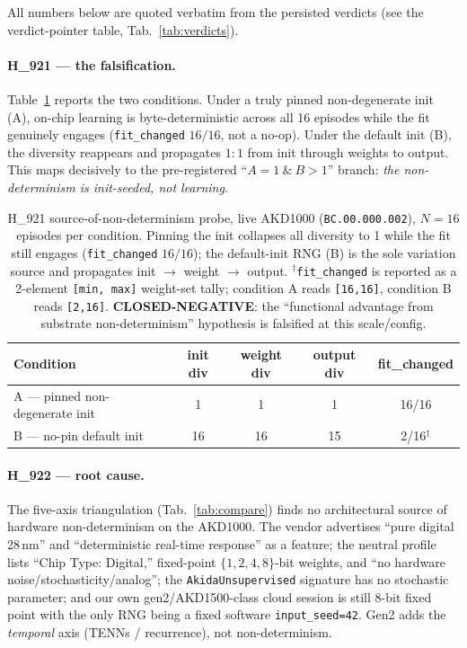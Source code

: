 \documentclass[11pt,a4paper]{article}
\providecommand{\tierRed}{🔴}
\renewcommand{\tierRed}{{\color{red!75!black}\textbullet}}
\begin{document}
All numbers below are quoted verbatim from the persisted verdicts (see the
verdict-pointer table, Tab.~\ref{tab:verdicts}).

\paragraph{H\_921 --- the falsification.} Table~\ref{tab:h921} reports the
two conditions. Under a truly pinned non-degenerate init (A), on-chip
learning is byte-deterministic across all 16 episodes while the fit
genuinely engages (\texttt{fit\_changed} \(16/16\), not a no-op). Under the
default init (B), the diversity reappears and propagates \(1{:}1\) from
init through weights to output. This maps decisively to the pre-registered
``\(A=1\ \&\ B>1\)'' branch: \emph{the non-determinism is init-seeded, not
learning}.

\begin{table}[h]
\centering
\small
\begin{tabular}{@{}lcccc@{}}
\toprule
\textbf{Condition} & \textbf{init div} & \textbf{weight div} & \textbf{output div} & \textbf{fit\_changed} \\
\midrule
A --- pinned non-degenerate init & 1  & 1  & 1  & 16/16 \\
B --- no-pin default init        & 16 & 16 & 15 & 2/16$^{\dagger}$ \\
\bottomrule
\end{tabular}
\caption{H\_921 source-of-non-determinism probe, live AKD1000
(\texttt{BC.00.000.002}), \(N=16\) episodes per condition. Pinning the init
collapses all diversity to 1 while the fit still engages
(\texttt{fit\_changed} \(16/16\)); the default-init RNG (B) is the sole
variation source and propagates init \(\rightarrow\) weight \(\rightarrow\)
output. $^{\dagger}$\texttt{fit\_changed} is reported as a 2-element
\texttt{[min, max]} weight-set tally; condition A reads \texttt{[16,16]},
condition B reads \texttt{[2,16]}. \tierRed{} \textbf{CLOSED-NEGATIVE}: the
``functional advantage from substrate non-determinism'' hypothesis is
falsified at this scale/config.}
\label{tab:h921}
\end{table}

\paragraph{H\_922 --- root cause.} The five-axis triangulation
(Tab.~\ref{tab:compare}) finds no architectural source of hardware
non-determinism on the AKD1000. The vendor advertises ``pure digital 28\,nm''
and ``deterministic real-time response'' as a feature; the neutral profile
lists ``Chip Type: Digital,'' fixed-point \(\{1,2,4,8\}\)-bit weights, and
``no hardware noise/stochasticity/analog''; the \texttt{AkidaUnsupervised}
signature has no stochastic parameter; and our own gen2/AKD1500-class cloud
session is still 8-bit fixed point with the only RNG being a fixed software
\texttt{input\_seed=42}. Gen2 adds the \emph{temporal} axis (TENNs /
recurrence), not non-determinism.
\end{document}
